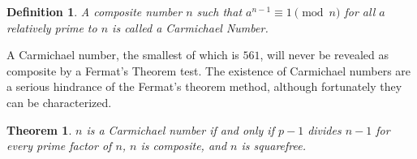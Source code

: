 \documentclass{article}
\newtheorem*{theorem}{Theorem}
\newtheorem*{definition}{Definition}
\begin{document}
 \begin{definition}
  A composite number $n$ such that $a^{n -1} \equiv 1 \pmod n$ for all $a$ relatively prime to $n$ is called a \textit{Carmichael Number}.
 \end{definition}
 
 A Carmichael number, the smallest of which is $561$, will never be revealed as composite by a Fermat's Theorem test. The existence of Carmichael numbers are a serious hindrance of the Fermat's theorem method, although fortunately they can be characterized.

\begin{theorem} $n$ is a Carmichael number if and only if $p-1$ divides $n-1$ for every prime factor of $n$, $n$ is composite, and $n$ is squarefree.
\end{theorem}
\end{document}
